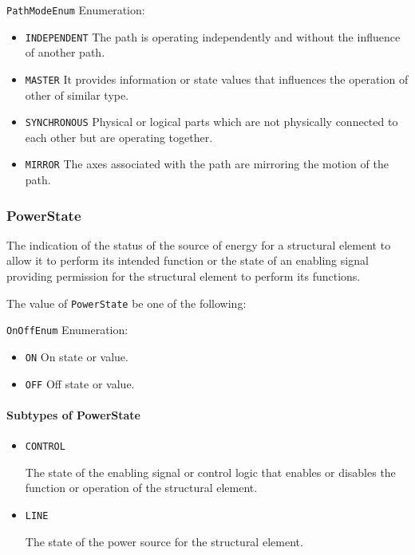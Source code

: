 \texttt{PathModeEnum} Enumeration:

\begin{itemize}
\item \texttt{INDEPENDENT} \newline The path is operating independently and without the influence of another path. 
\item \texttt{MASTER} \newline It provides information or state values that influences the operation of other  of similar type. 
\item \texttt{SYNCHRONOUS} \newline Physical or logical parts which are not physically connected to each other but are operating together. 
\item \texttt{MIRROR} \newline The axes associated with the path are mirroring the motion of the  path. 
\end{itemize}



\subsubsection{PowerState}
\label{sec:PowerState}



The indication of the status of the source of energy for a \gls{structural element} to allow it to perform its intended function or the state of an enabling signal providing permission for the \gls{structural element} to perform its functions.


The value of \texttt{PowerState} \MUST be one of the following: 


\texttt{OnOffEnum} Enumeration:

\begin{itemize}
\item \texttt{ON} \newline On state or value. 
\item \texttt{OFF} \newline Off state or value. 
\end{itemize}


\paragraph{Subtypes of PowerState}\mbox{}
\label{sec:Subtypes of PowerState}

\begin{itemize}

\item \texttt{CONTROL}


The state of the enabling signal or control logic that enables or disables the function or operation of the \gls{structural element}.

\item \texttt{LINE}


The state of the power source for the \gls{structural element}.


\end{itemize}





